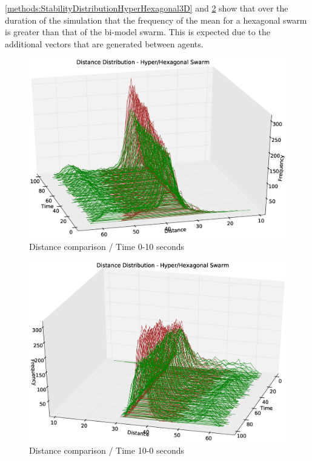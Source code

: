 \autoref{methods:StabilityDistributionHyperHexagonal3D} and \ref{methods:StabilityDistributionHyperHexagonal3D2} show that over the duration of the simulation that the frequency of the mean for a hexagonal swarm is greater than that of the bi-model swarm. This is expected due to the additional vectors that are generated between agents. 
\begin{figure}[H]
\begin{center}
\includegraphics[width=13cm]{CHAPTER-5/figures/StabilityDistibutionHyperHexagonal3D}
\end{center}
\caption{Distance comparison / Time 0-10 seconds\label{methods:StabilityDistributionHyperHexagonal3D}}
\end{figure}
\begin{figure}[H]
\begin{center}
\includegraphics[width=13cm]{CHAPTER-5/figures/StabilityDistibutionHyperHexagonal3D2}
\end{center}
\caption{Distance comparison / Time 10-0 seconds\label{methods:StabilityDistributionHyperHexagonal3D2}}
\end{figure}

